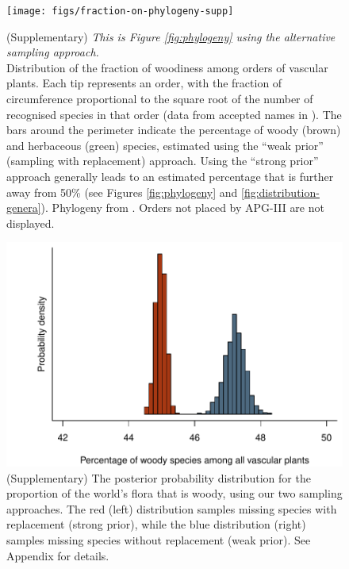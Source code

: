 \documentclass[a4paper,12pt]{article}
\begin{document}
\begin{figure}[p]
  \centering
  \texttt{[image: figs/fraction-on-phylogeny-supp]}

  \caption{(Supplementary)
    \textit{This is Figure \ref{fig:phylogeny} using the alternative
      sampling approach.}\\
    Distribution of the fraction of woodiness among orders of vascular
    plants.  Each tip represents an order, with the fraction of
    circumference proportional to the square root of the number of
    recognised species in that order (data from accepted names in
    \citet{ThePlantList}).  The bars around the perimeter indicate the
    percentage of woody (brown) and herbaceous (green) species,
    estimated using the ``weak prior'' (sampling with replacement)
    approach.  Using the ``strong prior'' approach generally leads to
    an estimated percentage that is further away from 50\% (see
    Figures \ref{fig:phylogeny} and \ref{fig:distribution-genera}).
    Phylogeny from \citep{Zanne}.  Orders not placed by APG-III
    \citep{APG3} are not displayed.}
  \label{fig:phylogeny-supp}
\end{figure}

\begin{figure}[p]
  \centering
  \includegraphics{figs/distribution-raw}
  \caption{(Supplementary) The posterior probability distribution for
    the proportion of the world's flora that is woody, using our two
    sampling approaches.  The red (left) distribution samples missing species
    with replacement (strong prior), while the blue distribution
    (right) samples missing species without replacement (weak prior).
    See Appendix for details.}
  \label{fig:distribution-raw}
\end{figure}
\end{document}

